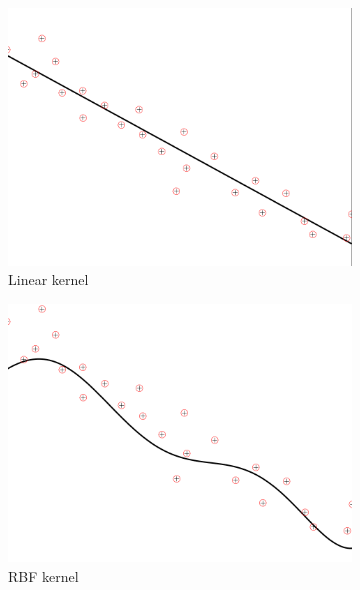 \documentclass[a4paper, 11pt, one column]{article}
\begin{document}
\begin{figure}[]
        \begin{subfigure}{0.33\linewidth}
            \includegraphics[width=\linewidth]{images/linear_e=0.png}
            \caption{Linear kernel}
        \end{subfigure}\hfil
        \begin{subfigure}{0.33\linewidth}
            \includegraphics[width=\linewidth]{images/RBF_e=0.png}
            \caption{RBF kernel}
        \end{subfigure}\hfil
        \centering
        \begin{subfigure}{0.33\linewidth}

\end{subfigure}
\end{figure}
\end{document}
